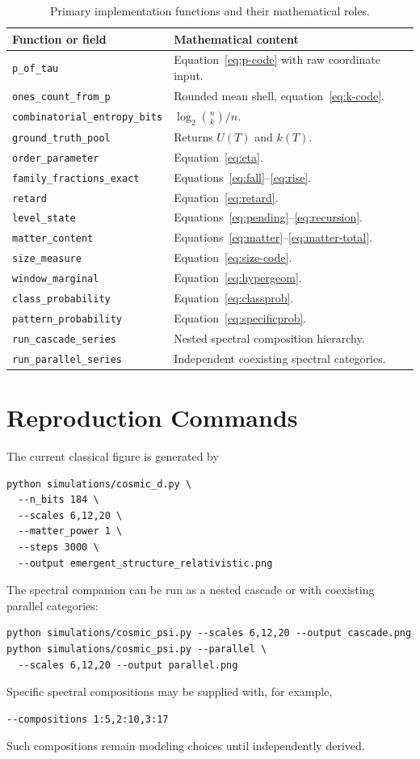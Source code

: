 \documentclass[11pt]{article}
\begin{document}
\begin{table}[ht]
\centering
\caption{Primary implementation functions and their mathematical roles.}
\small
\begin{tabular}{p{}p{}}
\toprule
Function or field & Mathematical content \\
\midrule
\texttt{p\_of\_tau} & Equation~\eqref{eq:p-code} with raw coordinate input. \\
\texttt{ones\_count\_from\_p} & Rounded mean shell, equation~\eqref{eq:k-code}. \\
\texttt{combinatorial\_entropy\_bits} & $\log_2\binom nk/n$. \\
\texttt{ground\_truth\_pool} & Returns $U(T)$ and $k(T)$. \\
\texttt{order\_parameter} & Equation~\eqref{eq:eta}. \\
\texttt{family\_fractions\_exact} & Equations~\eqref{eq:fall}--\eqref{eq:rise}. \\
\texttt{retard} & Equation~\eqref{eq:retard}. \\
\texttt{level\_state} & Equations~\eqref{eq:pending}--\eqref{eq:recursion}. \\
\texttt{matter\_content} & Equations~\eqref{eq:matter}--\eqref{eq:matter-total}. \\
\texttt{size\_measure} & Equation~\eqref{eq:size-code}. \\
\texttt{window\_marginal} & Equation~\eqref{eq:hypergeom}. \\
\texttt{class\_probability} & Equation~\eqref{eq:classprob}. \\
\texttt{pattern\_probability} & Equation~\eqref{eq:specificprob}. \\
\texttt{run\_cascade\_series} & Nested spectral composition hierarchy. \\
\texttt{run\_parallel\_series} & Independent coexisting spectral categories. \\
\bottomrule
\end{tabular}
\end{table}

\section{Reproduction Commands}
\label{app:commands}

The current classical figure is generated by
\begin{verbatim}
python simulations/cosmic_d.py \
  --n_bits 184 \
  --scales 6,12,20 \
  --matter_power 1 \
  --steps 3000 \
  --output emergent_structure_relativistic.png
\end{verbatim}
The spectral companion can be run as a nested cascade or with coexisting
parallel categories:
\begin{verbatim}
python simulations/cosmic_psi.py --scales 6,12,20 --output cascade.png
python simulations/cosmic_psi.py --parallel \
  --scales 6,12,20 --output parallel.png
\end{verbatim}
Specific spectral compositions may be supplied with, for example,
\begin{verbatim}
--compositions 1:5,2:10,3:17
\end{verbatim}
Such compositions remain modeling choices until independently derived.
\end{document}
